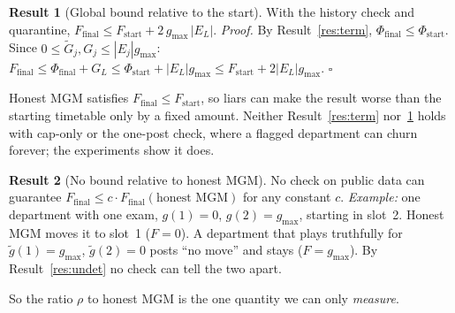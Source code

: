 \documentclass{article}
\theoremstyle{definition}
\newtheorem{result}{Result}
\newcommand{\1}{\mathbf{1}}
\newcommand{\gmax}{g_{\max}}
\begin{document}
\begin{result}[Global bound relative to the start]
\label{res:global}
With the history check and quarantine, $F_{\text{final}}\le F_{\text{start}}+2\,\gmax\,|E_L|$.
\emph{Proof.} By Result~\ref{res:term}, $\Phi_{\text{final}}\le\Phi_{\text{start}}$. Since $0\le\tilde G_j,G_j\le|E_j|\gmax$: $F_{\text{final}}\le\Phi_{\text{final}}+G_L\le\Phi_{\text{start}}+|E_L|\gmax\le F_{\text{start}}+2|E_L|\gmax$. $\square$
\end{result}
Honest MGM satisfies $F_{\text{final}}\le F_{\text{start}}$, so liars can make the result worse than the starting timetable only by a fixed amount. Neither Result~\ref{res:term} nor~\ref{res:global} holds with cap-only or the one-post check, where a flagged department can churn forever; the experiments show it does.

\begin{result}[No bound relative to honest MGM]
\label{res:neg}
No check on public data can guarantee $F_{\text{final}}\le c\cdot F_{\text{final}}(\text{honest MGM})$ for any constant $c$. \emph{Example:} one department with one exam, $g(1)=0$, $g(2)=\gmax$, starting in slot~2. Honest MGM moves it to slot~1 ($F=0$). A department that plays truthfully for $\tilde g(1)=\gmax$, $\tilde g(2)=0$ posts ``no move'' and stays ($F=\gmax$). By Result~\ref{res:undet} no check can tell the two apart.
\end{result}
So the ratio $\rho$ to honest MGM is the one quantity we can only \emph{measure}.



\end{document}
